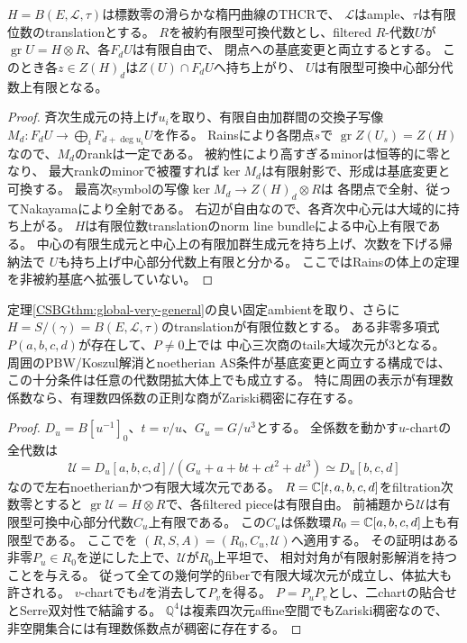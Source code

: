 \begin{lemma}[被約基底上の中心の持上げ]
\label{CSBGlem:global-center-lifting}
$H=B(E,\mathcal L,\tau)$は標数零の滑らかな楕円曲線のTHCRで、
$\mathcal L$はample、$\tau$は有限位数のtranslationとする。
$R$を被約有限型可換代数とし、filtered $R$-代数$U$が
$\operatorname{gr}U=H\otimes R$、各$F_dU$は有限自由で、
閉点への基底変更と両立するとする。
このとき各$z\in Z(H)_d$は$Z(U)\cap F_dU$へ持ち上がり、
$U$は有限型可換中心部分代数上有限となる。
\end{lemma}
\begin{proof}
斉次生成元の持上げ$u_i$を取り、有限自由加群間の交換子写像
$M_d:F_dU\to\bigoplus_iF_{d+\deg u_i}U$を作る。
Rains\cite[Theorem~2.13]{CSBGRainsElliptic}により各閉点$s$で
$\operatorname{gr}Z(U_s)=Z(H)$なので、$M_d$のrankは一定である。
被約性により高すぎるminorは恒等的に零となり、
最大rankのminorで被覆すれば$\ker M_d$は有限射影で、形成は基底変更と可換する。
最高次symbolの写像$\ker M_d\to Z(H)_d\otimes R$は
各閉点で全射、従ってNakayamaにより全射である。
右辺が自由なので、各斉次中心元は大域的に持ち上がる。
$H$は有限位数translationのnorm line bundleによる中心上有限である。
中心の有限生成元と中心上の有限加群生成元を持ち上げ、次数を下げる帰納法で
$U$も持ち上げ中心部分代数上有限と分かる。
ここではRainsの体上の定理を非被約基底へ拡張していない。
\end{proof}

\begin{theorem}[有限位数境界を持つ固定ambientの開な正則範囲]
\label{CSBGthm:global-open}
定理\ref{CSBGthm:global-very-general}の良い固定ambientを取り、さらに
$H=S/(\gamma)=B(E,\mathcal L,\tau)$のtranslationが有限位数とする。
ある非零多項式$P(a,b,c,d)$が存在して、$P\ne0$上では
中心三次商のtails大域次元が3となる。
周囲のPBW/Koszul解消とnoetherian AS条件が基底変更と両立する構成では、
この十分条件は任意の代数閉拡大体上でも成立する。
特に周囲の表示が有理数係数なら、有理数四係数の正則な商がZariski稠密に存在する。
\end{theorem}
\begin{proof}
$D_u=B[u^{-1}]_0$、$t=v/u$、$G_u=G/u^3$とする。
全係数を動かす$u$-chartの全代数は
\[
 \mathcal U=D_u[a,b,c,d]/(G_u+a+bt+ct^2+dt^3)
 \simeq D_u[b,c,d]
\]
なので左右noetherianかつ有限大域次元である。
$R=\mathbb C[t,a,b,c,d]$をfiltration次数零とすると
$\operatorname{gr}\mathcal U=H\otimes R$で、各filtered pieceは有限自由。
前補題から$\mathcal U$は有限型可換中心部分代数$C_u$上有限である。
この$C_u$は係数環$R_0=\mathbb C[a,b,c,d]$上も有限型である。
ここで\cite[Proposition~2.1, proof steps (6)--(7)]{CSBGRSVBertini}を
$(R,S,A)=(R_0,C_u,\mathcal U)$へ適用する。
その証明はある非零$P_u\in R_0$を逆にした上で、$\mathcal U$が$R_0$上平坦で、
相対対角が有限射影解消を持つことを与える。
従って全ての幾何学的fiberで有限大域次元が成立し、体拡大も許される。
$v$-chartでも$d$を消去して$P_v$を得る。
$P=P_uP_v$とし、二chartの貼合せとSerre双対性で結論する。
$\mathbb Q^4$は複素四次元affine空間でもZariski稠密なので、
非空開集合には有理数係数点が稠密に存在する。
\end{proof}

